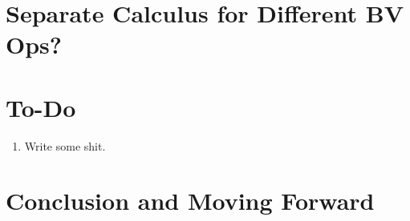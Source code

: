 \documentclass{article}
\begin{document}
\section{Separate Calculus for Different BV Ops?}
\label{sec:calc}

	
	
\section{To-Do}
	\begin{enumerate}
		\item Write some shit.
	\end{enumerate}
	
	
\section{Conclusion and Moving Forward}
\label{sec:conc}



\end{document}
